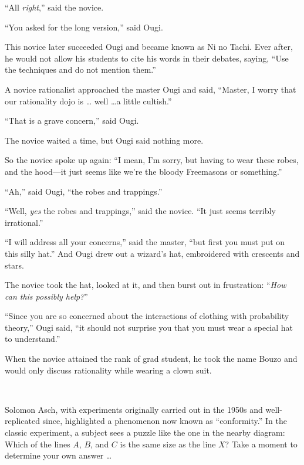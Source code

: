{
 ``All \textit{right},'' said
the novice.}

{
 ``You asked for the long
version,'' said Ougi.}

{
 This novice later succeeded Ougi and became known as Ni no Tachi.
Ever after, he would not allow his students to cite his words in their
debates, saying, ``Use the techniques and do not
mention them.''}

\hr

{
 A novice rationalist approached the master Ougi and said,
``Master, I worry that our rationality dojo is \ldots
well \ldots a little cultish.''}

{
 ``That is a grave concern,''
said Ougi.}

{
 The novice waited a time, but Ougi said nothing more.}

{
 So the novice spoke up again: ``I mean,
I'm sorry, but having to wear these robes, and the
hood---it just seems like we're the bloody Freemasons
or something.''}

{
 ``Ah,'' said Ougi,
``the robes and trappings.''}

{
 ``Well, \textit{yes} the robes and
trappings,'' said the novice. ``It
just seems terribly irrational.''}

{
 ``I will address all your
concerns,'' said the master, ``but
first you must put on this silly hat.'' And Ougi drew
out a wizard's hat, embroidered with crescents and
stars.}

{
 The novice took the hat, looked at it, and then burst out in
frustration: ``\textit{How can this possibly
help?}''}

{
 ``Since you are so concerned about the
interactions of clothing with probability theory,''
Ougi said, ``it should not surprise you that you must
wear a special hat to understand.''}

{
 When the novice attained the rank of grad student, he took the
name Bouzo and would only discuss rationality while wearing a clown
suit.}

\myendsectiontext




{
 ~}

{
 Solomon Asch, with experiments originally carried out in the 1950s
and well-replicated since, highlighted a phenomenon now known as
``conformity.'' In the classic
experiment, a subject sees a puzzle like the one in the nearby diagram:
Which of the lines $A$, $B$, and $C$ is the same size as the line $X$? Take a
moment to determine your own answer \ldots}


